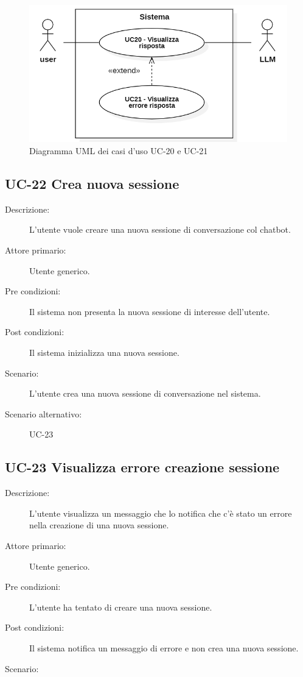 \begin{figure}[H]
    \centering
    \includegraphics[width=0.8\linewidth]{UC20-21.PNG}
    \caption{Diagramma UML dei casi d'uso UC-20 e UC-21}
    \label{fig:UC20-21}
\end{figure}

\subsection{UC-22 Crea nuova sessione}
\begin{description}
    \item[Descrizione:] L'utente vuole creare una nuova sessione di conversazione col chatbot.
    \item[Attore primario:] Utente generico.
    \item[Pre condizioni:] Il sistema non presenta la nuova sessione di interesse dell'utente.
    \item[Post condizioni:] Il sistema inizializza una nuova sessione.
    \item[Scenario:] L'utente crea una nuova sessione di conversazione nel sistema.
    \item[Scenario alternativo:] UC-23
\end{description}

\subsection{UC-23 Visualizza errore creazione sessione}
\begin{description}
    \item[Descrizione:] L'utente visualizza un messaggio che lo notifica che c'è stato un errore nella creazione di una nuova sessione.
    \item[Attore primario:] Utente generico.
    \item[Pre condizioni:] L'utente ha tentato di creare una nuova sessione.
    \item[Post condizioni:] Il sistema notifica un messaggio di errore e non crea una nuova sessione.
    \item[Scenario:] 
\end{description}

